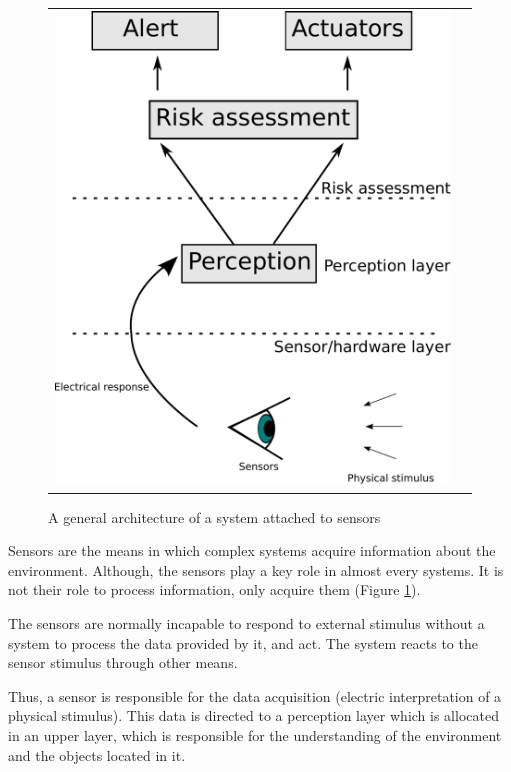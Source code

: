 \begin{figure}[h]
   \centering
     \begin{tabular}{lr}
       \includegraphics[scale=0.45]{img/fig:sensors:roles}
     \end{tabular}
   \caption{A general architecture of a system attached to sensors}
   \label{fig:sensors:role}
 \end{figure}

Sensors are the means in which complex systems acquire information about the environment. Although, the sensors play a key role in almost every systems. It is not their role to process information, only acquire them (Figure \ref{fig:sensors:role}). 

The sensors are normally incapable to respond to external stimulus without a system to process the data provided by it, and act. The system reacts to the sensor stimulus through other means.

Thus, a sensor is responsible for the data acquisition (electric interpretation of a physical stimulus). This data is directed to a perception layer which is allocated in an upper layer, which is responsible for the understanding of the environment and the objects located in it. 


